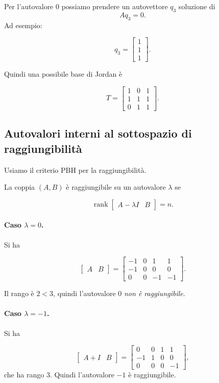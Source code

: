 Per l'autovalore \(0\) possiamo prendere un autovettore \(q_3\) soluzione di
\[
Aq_3=0.
\]
Ad esempio:

\[
q_3=
\begin{bmatrix}
1\\
1\\
1
\end{bmatrix}.
\]

Quindi una possibile base di Jordan è

\[
T=
\begin{bmatrix}
1 & 0 & 1\\
1 & 1 & 1\\
0 & 1 & 1
\end{bmatrix}.
\]

\bigskip

\subsection{Autovalori interni al sottospazio di raggiungibilità}

Usiamo il criterio PBH per la raggiungibilità.

La coppia \((A,B)\) è raggiungibile su un autovalore \(\lambda\) se

\[
\operatorname{rank}\begin{bmatrix}
A-\lambda I & B
\end{bmatrix}=n.
\]

\paragraph{Caso \(\lambda=0\).}
Si ha

\[
\begin{bmatrix}
A & B
\end{bmatrix}
=
\begin{bmatrix}
-1 & 0 & 1 & 1\\
-1 & 0 & 0 & 0\\
0 & 0 & -1 & -1
\end{bmatrix}.
\]

Il rango è \(2<3\), quindi l'autovalore \(0\) \emph{non è raggiungibile}.

\paragraph{Caso \(\lambda=-1\).}
Si ha

\[
\begin{bmatrix}
A+I & B
\end{bmatrix}
=
\begin{bmatrix}
0 & 0 & 1 & 1\\
-1 & 1 & 0 & 0\\
0 & 0 & 0 & -1
\end{bmatrix},
\]
che ha rango \(3\). Quindi l'autovalore \(-1\) è raggiungibile.

